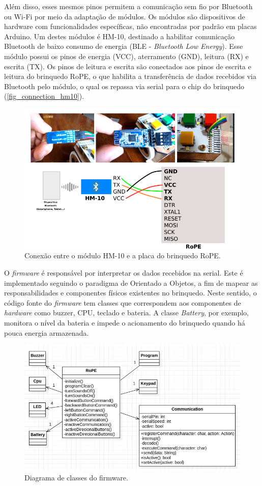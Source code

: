 Além disso, esses mesmos pinos permitem a comunicação sem fio por Bluetooth ou Wi-Fi por meio da adaptação de módulos. Os módulos são dispositivos de hardware com funcionalidades específicas, não encontradas por padrão em placas Arduino. Um destes módulos é HM-10, destinado a habilitar comunicação Bluetooth de baixo consumo de energia (BLE - \textit{Bluetooth Low Energy}). Esse módulo possui os pinos de energia (VCC), aterramento (GND), leitura (RX) e escrita (TX). Os pinos de leitura e escrita são conectados aos pinos de escrita e leitura do brinquedo RoPE, o que habilita a transferência de dados recebidos via Bluetooth pelo módulo, o qual os repassa via serial para o chip do brinquedo (\autoref{fig_connection_hm10}).

\begin{figure}[!h]
    \centering
    \includegraphics[width=.8\linewidth,fbox]{figs/connection_rope_hm10.png}
    \caption{Conexão entre o módulo HM-10 e a placa do brinquedo RoPE.}
    \label{fig_connection_hm10}
    \sourceauthor
\end{figure}

O \textit{firmware} é responsável por interpretar os dados recebidos na serial. Este é implementado seguindo o paradigma de Orientado a Objetos, a fim de mapear as responsabilidades e componentes físicos existentes no brinquedo. Neste sentido, o código fonte do \textit{firmware} tem classes que correspondem aos componentes de \textit{hardware} como buzzer, CPU, teclado e bateria. A classe \textit{Battery}, por exemplo, monitora o nível da bateria e impede o acionamento do brinquedo quando há pouca energia armazenada.

\begin{figure}[!ht]
    \centering
    \includegraphics[width=.8\linewidth,fbox]{figs/class_diagram_firmware.png}
    \caption{Diagrama de classes do firmware.}
    \label{fig:classes_firmware}
    \sourceauthor
\end{figure}

